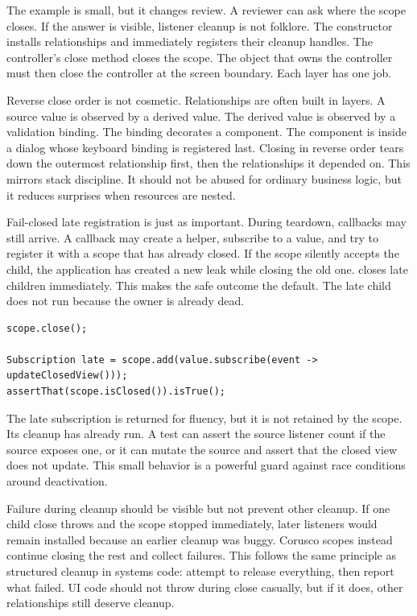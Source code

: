 The example is small, but it changes review. A reviewer can ask where the
scope closes. If the answer is visible, listener cleanup is not folklore. The
constructor installs relationships and immediately registers their cleanup
handles. The controller's close method closes the scope. The object that owns
the controller must then close the controller at the screen boundary. Each
layer has one job.

Reverse close order is not cosmetic. Relationships are often built in layers.
A source value is observed by a derived value. The derived value is observed by
a validation binding. The binding decorates a component. The component is
inside a dialog whose keyboard binding is registered last. Closing in reverse
order tears down the outermost relationship first, then the relationships it
depended on. This mirrors stack discipline. It should not be abused for
ordinary business logic, but it reduces surprises when resources are nested.

Fail-closed late registration is just as important. During teardown, callbacks
may still arrive. A callback may create a helper, subscribe to a value, and try
to register it with a scope that has already closed. If the scope silently
accepts the child, the application has created a new leak while closing the old
one.  closes late children immediately. This makes
the safe outcome the default. The late child does not run because the owner is
already dead.

\begin{lstlisting}[caption={Late registration fails closed.}]
scope.close();

Subscription late = scope.add(value.subscribe(event -> updateClosedView()));
assertThat(scope.isClosed()).isTrue();
\end{lstlisting}

The late subscription is returned for fluency, but it is not retained by the
scope. Its cleanup has already run. A test can assert the source listener count
if the source exposes one, or it can mutate the source and assert that the
closed view does not update. This small behavior is a powerful guard against
race conditions around deactivation.

Failure during cleanup should be visible but not prevent other cleanup. If one
child close throws and the scope stopped immediately, later listeners would
remain installed because an earlier cleanup was buggy. Corusco scopes instead
continue closing the rest and collect failures. This follows the same principle
as structured cleanup in systems code: attempt to release everything, then
report what failed. UI code should not throw during close casually, but if it
does, other relationships still deserve cleanup.

